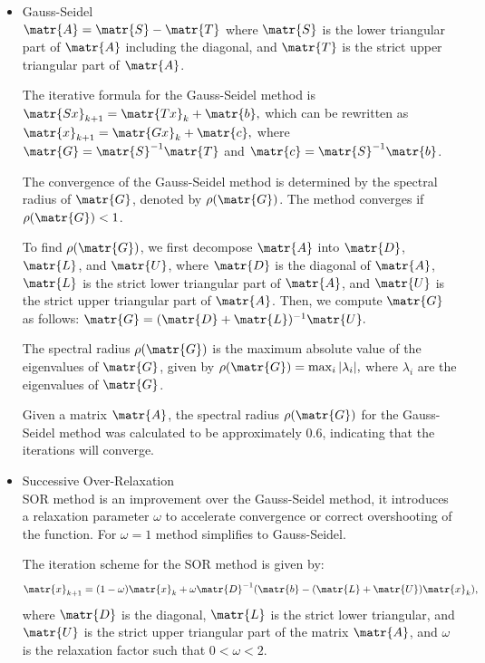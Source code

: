 \begin{itemize}
  \item Gauss-Seidel\\
    
    $ \matr{A} = \matr{S} - \matr{T} $
    where $ \matr{S} $ is the lower triangular part of $ \matr{A} $ including the diagonal, and $ \matr{T} $ is the strict upper triangular part of $ \matr{A} $.

    The iterative formula for the Gauss-Seidel method is
    $ \matr{Sx}_{k+1} = \matr{Tx}_k + \matr{b}, $
    which can be rewritten as
    $ \matr{x}_{k+1} = \matr{Gx}_k + \matr{c}, $
    where $ \matr{G} = \matr{S}^{-1}\matr{T} $ and $ \matr{c} = \matr{S}^{-1}\matr{b} $.

    The convergence of the Gauss-Seidel method is determined by the spectral radius of $ \matr{G} $, denoted by $ \rho(\matr{G}) $. The method converges if $ \rho(\matr{G}) < 1 $.

    To find $ \rho(\matr{G}) $, we first decompose $ \matr{A} $ into $ \matr{D} $, $ \matr{L} $, and $ \matr{U} $, where $ \matr{D} $ is the diagonal of $ \matr{A} $, $ \matr{L} $ is the strict lower triangular part of $ \matr{A} $, and $ \matr{U} $ is the strict upper triangular part of $ \matr{A} $. Then, we compute $ \matr{G} $ as follows:
    $ \matr{G} = (\matr{D} + \matr{L})^{-1}\matr{U}. $

    The spectral radius $ \rho(\matr{G}) $ is the maximum absolute value of the eigenvalues of $ \matr{G} $, given by
    $ \rho(\matr{G}) = \max_i |\lambda_i|, $
    where $ \lambda_i $ are the eigenvalues of $ \matr{G} $.

    Given a matrix $ \matr{A} $, the spectral radius $ \rho(\matr{G}) $ for the Gauss-Seidel method was calculated to be approximately 0.6, indicating that the iterations will converge.
      
  \item Successive Over-Relaxation \\

    SOR method is an improvement over the Gauss-Seidel method, it introduces a relaxation parameter $ \omega $ to accelerate convergence or correct overshooting of the function.
    For $\omega = 1$ method simplifies to Gauss-Seidel.

    The iteration scheme for the SOR method is given by:
    $$ \matr{x}_{k+1} = (1-\omega)\matr{x}_k + \omega \matr{D}^{-1}(\matr{b} - (\matr{L} + \matr{U})\matr{x}_k), $$
    where $ \matr{D} $ is the diagonal, $ \matr{L} $ is the strict lower triangular, and $ \matr{U} $ is the strict upper triangular part of the matrix $ \matr{A} $, and $ \omega $ is the relaxation factor such that $ 0 < \omega < 2 $.


\end{itemize}
